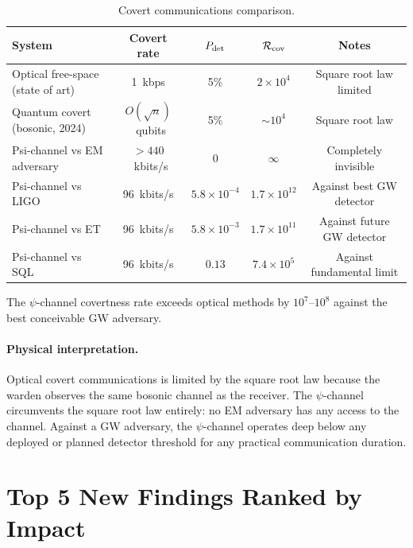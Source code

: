 \documentclass[aps,prd,twocolumn,superscriptaddress,nofootinbib]{revtex4-2}
\begin{document}
\begin{table}[t]
\centering
\caption{Covert communications comparison.}
\begin{tabular}{lcccc}
\hline\hline
System & Covert rate & $P_{\rm det}$ & $\mathcal{R}_{\rm cov}$ & Notes \\
\hline
Optical free-space (state of art) & 1~kbps & 5\% & $2\times 10^4$ & Square root law limited \\
Quantum covert (bosonic, 2024) & $O(\sqrt{n})$~qubits & 5\% & $\sim 10^4$ & Square root law \\
Psi-channel vs EM adversary & $>440$~kbits/s & 0 & $\infty$ & Completely invisible \\
Psi-channel vs LIGO & 96~kbits/s & $5.8\times10^{-4}$ & $1.7\times 10^{12}$ & Against best GW detector \\
Psi-channel vs ET & 96~kbits/s & $5.8\times10^{-3}$ & $1.7\times 10^{11}$ & Against future GW detector \\
Psi-channel vs SQL & 96~kbits/s & $0.13$ & $7.4\times 10^5$ & Against fundamental limit \\
\hline\hline
\end{tabular}
\label{tab:covert}
\end{table}

The $\psi$-channel covertness rate exceeds optical methods by
$10^7$--$10^8$ against the best conceivable GW adversary.

\paragraph{Physical interpretation.}
Optical covert communications is limited by the square root law because
the warden observes the same bosonic channel as the receiver. The
$\psi$-channel circumvents the square root law entirely: no EM adversary
has any access to the channel. Against a GW adversary, the $\psi$-channel
operates deep below any deployed or planned detector threshold for any
practical communication duration.

\section{Top 5 New Findings Ranked by Impact}
\label{sec:findings}
\end{document}
